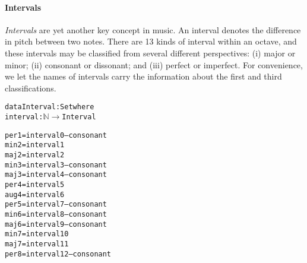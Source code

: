 \paragraph{Intervals}
\emph{Intervals} are yet another key concept in music.
An interval denotes the difference in pitch between two notes.
There are 13 kinds of interval within an octave, and these intervals
may be classified from several different perspectives: (i) major or minor;
(ii) consonant or dissonant; and (iii) perfect or imperfect.
For convenience, we let the names of intervals carry the information
about the first and third classifications.

\begin{alltt}
data Interval : Set where
interval : \(\mathbb{N}\) \(\rightarrow\) Interval

per1  = interval 0 -- consonant
min2  = interval 1
maj2  = interval 2
min3  = interval 3 -- consonant
maj3  = interval 4 -- consonant
per4  = interval 5 
aug4  = interval 6
per5  = interval 7 -- consonant
min6  = interval 8 -- consonant
maj6  = interval 9 -- consonant
min7  = interval 10
maj7  = interval 11
per8  = interval 12 -- consonant
\end{alltt}
